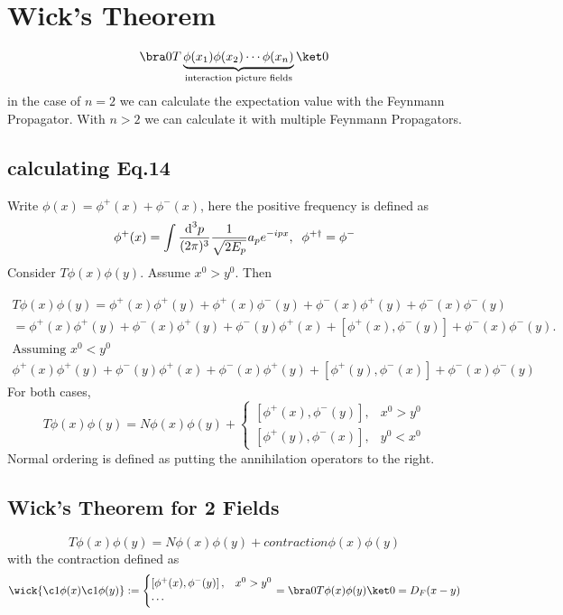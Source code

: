 \documentclass[]{scrartcl}
\begin{document}
\section{Wick's Theorem}
\begin{gather}
	\bra0 T \underbrace{\phi(x_1)\phi(x_2)\cdots\phi(x_n)}_{\text{interaction picture fields}}\ket0
\end{gather}
in the case of $n=2$ we can calculate the expectation value with the Feynmann Propagator. With $n>2$ we can calculate it with multiple Feynmann Propagators.
\subsection{calculating Eq.14}

Write $\phi(x) = \phi^{+}(x) + \phi^- (x)$, here the positive frequency is defined as
$$
\phi^+(x) = \int\frac{\text d^3p}{(2\pi)^3}\frac{1}{\sqrt{2E_p}}a_pe^{-ipx},\;\; \phi^{+\dagger} = \phi^-
$$
Consider $T\phi(x)\phi(y)$. Assume $x^0 > y^0$. Then 

\begin{gather}
T\phi(x)\phi(y) = \phi^+(x)\phi^+(y) + \phi^+(x)\phi^-(y) + \phi^-(x)\phi^+(y) + \phi^-(x)\phi^-(y)\\
= \phi^+(x)\phi^+(y) + \phi^-(x)\phi^+(y) + \phi^-(y)\phi^+(x) + \left[\phi^+(x),\phi^-(y)\right] + \phi^-(x)\phi^-(y).\\
\text{Assuming $x^0 < y^0$}\nonumber\\
\phi^+(x)\phi^+(y) + \phi^-(y)\phi^+(x) + \phi^-(x)\phi^+(y) + \left[\phi^+(y), \phi^-(x)\right] + \phi^-(x)\phi^-(y)
\end{gather}
For both cases,
$$
T\phi(x)\phi(y) = N\phi(x)\phi(y) +
\begin{cases}
	\left[\phi^+(x),\phi^-(y)\right], & x^0>y^0\\
	\left[\phi^+(y),\phi^-(x)\right], & y^0<x^0
\end{cases}
$$
Normal ordering is defined as
putting the annihilation operators to the right.
\subsection{Wick's Theorem for 2 Fields}
\begin{equation}
	T\phi(x)\phi(y) = N\phi(x)\phi(y) + contraction \phi(x)\phi(y)
\end{equation}
with the contraction defined as
\begin{equation}
	\wick{ \c1\phi(x)\c1\phi(y) }:= 
	\begin{cases}
		\left[\phi^+(x),\phi^-(y)\right], & x^0 > y^0\\
		\cdots
	\end{cases} = \bra0 T\phi(x)\phi(y) \ket0 = D_F(x-y)
\end{equation}
\end{document}
